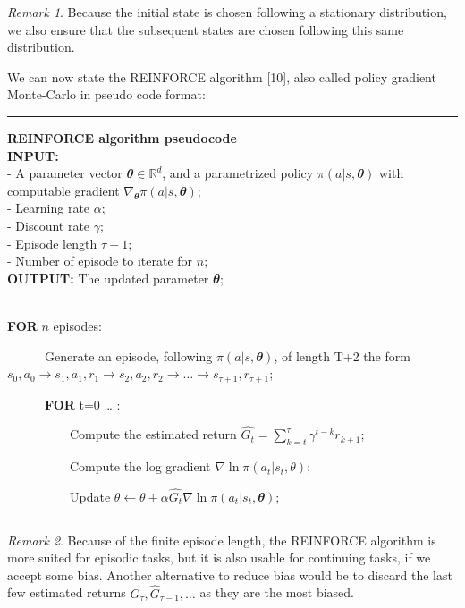 \documentclass[
  letterpaper,
]{report}
\theoremstyle{definition}
\theoremstyle{plain}
\theoremstyle{definition}
\theoremstyle{remark}
\newtheorem*{remark}{Remark}
\begin{document}
\begin{remark}
Because the initial state is chosen following a stationary distribution,
we also ensure that the subsequent states are chosen following this same
distribution.
\end{remark}

We can now state the REINFORCE algorithm {[}10{]}, also called policy
gradient Monte-Carlo in pseudo code format:

\begin{center}\rule{0.5\linewidth}{0.5pt}\end{center}

\textbf{REINFORCE algorithm pseudocode}\\
\textbf{INPUT:}\\
- A parameter vector \(\mathbfit{\theta} \in\mathbb{R}^d\), and a
parametrized policy \(\pi(a|s,\mathbfit{\theta})\) with computable
gradient \(\nabla_{\mathbfit{\theta}} \pi(a|s,\mathbfit{\theta})\);\\
- Learning rate \(\alpha\);\\
- Discount rate \(\gamma\);\\
- Episode length \(\tau+1\);\\
- Number of episode to iterate for \(n\);\\
\textbf{OUTPUT:} The updated parameter \(\mathbfit{\theta}\);\\
\strut \\
\textbf{FOR} \(n\) episodes:\\
\strut ~~~~~~Generate an episode, following
\(\pi(a|s,\mathbfit{\theta})\), of length T+2 the form
\(s_0,a_0 \to s_1,a_1,r_1 \to s_2,a_2,r_2 \to \dots \to s_{\tau+1}, r_{\tau+1}\);\\
\strut ~~~~~~\textbf{FOR} t=0 \ldots{} \tau:\\
\strut ~~~~~~~~~~Compute the estimated return
\(\hat{G_t} = \sum_{k=t}^\tau \gamma^{t-k}r_{k+1}\);\\
\strut ~~~~~~~~~~Compute the log gradient
\(\nabla \ln \pi(a_t|s_t,\theta)\);\\
\strut ~~~~~~~~~~Update
\(\theta \leftarrow \theta + \alpha \hat{G_t} \nabla \ln \pi(a_t|s_t,\mathbfit{\theta})\);\\

\begin{center}\rule{0.5\linewidth}{0.5pt}\end{center}

\begin{remark}
Because of the finite episode length, the REINFORCE algorithm is more
suited for episodic tasks, but it is also usable for continuing tasks,
if we accept some bias. Another alternative to reduce bias would be to
discard the last few estimated returns
\(\hat{G}_\tau, \hat{G}_{\tau-1}, \dots\) as they are the most biased.
\end{remark}
\end{document}
